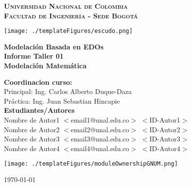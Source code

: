 \documentclass[11pt,stdletter,orderfromtodate,sigleft,twoside]{report}
\newcommand{\uncol}{Universidad Nacional de Colombia}
\newcommand{\facingbog}{Facultad de Ingeniería - Sede Bogotá}
\newcommand{\module}{Modelación Matemática}
\newcommand{\reportType}{Informe Taller 01}
\newcommand{\reportSubject}{Modelación Basada en EDOs}
\newenvironment{rightbox}[1]
 {\itemize[
    nosep,
    leftmargin=\dimexpr\textwidth-#1\relax,
    rightmargin=2pt,
    itemindent=\parindent,
    listparindent=\parindent,
  ]\item[]\relax}
 {\enditemize}
\begin{document}


\begin{titlepage}
\center

\vspace*{-12mm}
{\huge \textbf{\textsc{\uncol}}}\\
{\Large \textbf{\textsc{\facingbog}}}\\[20mm]

\vfill

\texttt{[image: ./templateFigures/escudo.png]}\\[20mm]

\vfill

\begin{framed}
{\Huge \textbf{\reportSubject}}\\[4mm]
{\huge \textbf{\reportType}}\\[4mm]
{\huge \textbf{\module}}
\end{framed}
\vspace{12mm}

\vfill

{\Large \textbf{Coordinacion curso:}}\\[4mm]
{\large Principal: Ing. Carlos Alberto Duque-Daza\\[2mm]
        Práctica: Ing. Juan Sebastian Hincapie}\\[12mm]

{\Large \textbf{Estudiantes/Autores}}\\[4mm]
{\large Nombre de Autor1 $<$email1@unal.edu.co$>$ $<$ID-Autor1$>$}\\[2mm]
{\large Nombre de Autor2 $<$email2@unal.edu.co$>$ $<$ID-Autor2$>$}\\[2mm]
{\large Nombre de Autor3 $<$email3@unal.edu.co$>$ $<$ID-Autor3$>$}\\[2mm]
{\large Nombre de Autor4 $<$email4@unal.edu.co$>$ $<$ID-Autor4$>$}\\[12mm]


\vfill
\begin{rightbox}{2.5cm}
    \texttt{[image: ./templateFigures/moduleOwnershipGNUM.png]}
\end{rightbox}
\vfill

\today

\end{titlepage}
\newpage
\end{document}
